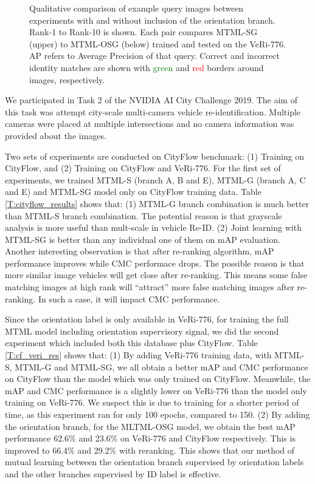 \documentclass[10pt,twocolumn,letterpaper]{article}
\begin{document}
\begin{figure}[ht]
    \caption{
        Qualitative comparison of example query images between experiments with
        and without inclusion of the orientation branch.
        Rank-1 to Rank-10 is shown. Each pair compares MTML-SG
        (upper) to MTML-OSG (below) trained and tested on the VeRi-776.
        AP refers to Average Precision of that query. Correct and
        incorrect identity matches are shown with \textcolor{green}{green}
        and \textcolor{red}{red} borders around images, respectively.
    }
    \label{fig:ranks}
\end{figure}

We participated in Task 2 of the NVIDIA AI City Challenge 2019. The aim of this
task was attempt city-scale multi-camera vehicle re-identification. Multiple
cameras were placed at multiple intersections and no camera information was
provided about the images.

Two sets of experiments are conducted on CityFlow benchmark:
(1) Training on CityFlow, and (2) Training on CityFlow and VeRi-776.
%
For the first set of experiments, we trained MTML-S (branch A, B and E),
MTML-G (branch A, C and E) and MTML-SG model only on CityFlow training data.
Table \ref{T:cityflow_results} shows that:
(1) MTML-G branch combination is much better than MTML-S branch combination.
The potential reason is that grayscale analysis is more useful than mult-scale in vehicle Re-ID.
(2) Joint learning with MTML-SG is better than any individual one of them on mAP evaluation.
Another interesting observation is that
after re-ranking algorithm, mAP performance improves while CMC performace drops.
The possible reason is that more similar image vehicles will get close after re-ranking.
This means some false matching images at high rank will ``attract'' more false matching images after re-ranking.
In such a case, it will impact CMC performance.

Since the orientation label is only available in VeRi-776,
for training the full MTML model including orientation supervisory signal,
we did the second experiment which included both this database plus CityFlow.
%
Table \ref{T:cf_veri_res} shows that:
(1) By adding VeRi-776 training data,
with MTML-S, MTML-G and MTML-SG,
we all obtain a better mAP and CMC performance on CityFlow
than the model which was only trained on CityFlow.
Meanwhile, the mAP and CMC performance is a slightly lower on VeRi-776
than the model only training on VeRi-776. We suspect this is due to training
for a shorter period of time, as this experiment ran for only 100 epochs, compared to 150.
(2) By adding the orientation branch, for the MLTML-OSG model,
we obtain the best mAP performance {62.6\%} and {23.6\%} on VeRi-776 and
CityFlow respectively. This is improved to {66.4\%} and {29.2\%} with reranking.
This shows that our method of mutual learning between the orientation branch supervised by orientation labels and the other branches supervised by ID label is effective.
\end{document}
